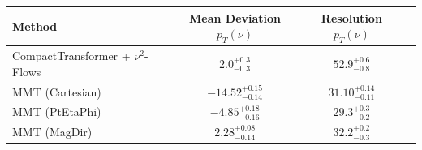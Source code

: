     \begin{tabular}{lccc}
        \toprule
        Method & Mean Deviation $p_{T}({\nu})$ & Resolution $p_{T}({\nu})$ \\
        \midrule
        CompactTransformer + $\nu^2$-Flows & $2.0^{+0.3}_{-0.3}$ & $52.9^{+0.6}_{-0.8}$ \\
        MMT (Cartesian) & $-14.52^{+0.15}_{-0.14}$ & $31.10^{+0.14}_{-0.11}$ \\
        MMT (PtEtaPhi) & $-4.85^{+0.18}_{-0.16}$ & $29.3^{+0.3}_{-0.2}$ \\
        MMT (MagDir) & $2.28^{+0.08}_{-0.14}$ & $32.2^{+0.2}_{-0.3}$ \\
        \bottomrule
    \end{tabular}